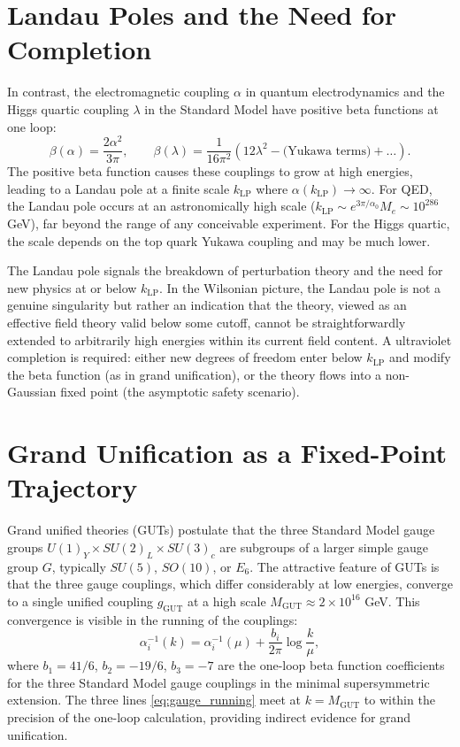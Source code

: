 \documentclass[11pt, twoside, openright]{book}
\theoremstyle{dotted}
\theoremstyle{definition}
\begin{document}
\section{Landau Poles and the Need for Completion}

In contrast, the electromagnetic coupling $\alpha$ in quantum electrodynamics and
the Higgs quartic coupling $\lambda$ in the Standard Model have positive beta
functions at one loop:
\begin{equation}
  \beta(\alpha) = \frac{2\alpha^2}{3\pi}, \qquad
  \beta(\lambda) = \frac{1}{16\pi^2}\left(12\lambda^2 - \text{(Yukawa terms)} + \ldots\right).
  \label{eq:qed_higgs_beta}
\end{equation}
The positive beta function causes these couplings to grow at high energies, leading
to a Landau pole at a finite scale $k_{\mathrm{LP}}$ where $\alpha(k_{\mathrm{LP}})
\to \infty$. For QED, the Landau pole occurs at an astronomically high scale
($k_{\mathrm{LP}} \sim e^{3\pi/\alpha_0} M_e \sim 10^{286}$ GeV), far beyond the
range of any conceivable experiment. For the Higgs quartic, the scale depends on
the top quark Yukawa coupling and may be much lower.

The Landau pole signals the breakdown of perturbation theory and the need for new
physics at or below $k_{\mathrm{LP}}$. In the Wilsonian picture, the Landau pole
is not a genuine singularity but rather an indication that the theory, viewed as
an effective field theory valid below some cutoff, cannot be straightforwardly
extended to arbitrarily high energies within its current field content. A
ultraviolet completion is required: either new degrees of freedom enter below
$k_{\mathrm{LP}}$ and modify the beta function (as in grand unification), or the
theory flows into a non-Gaussian fixed point (the asymptotic safety scenario).

\section{Grand Unification as a Fixed-Point Trajectory}

Grand unified theories (GUTs) postulate that the three Standard Model gauge groups
$U(1)_Y \times SU(2)_L \times SU(3)_c$ are subgroups of a larger simple gauge
group $G$, typically $SU(5)$, $SO(10)$, or $E_6$. The attractive feature of GUTs
is that the three gauge couplings, which differ considerably at low energies,
converge to a single unified coupling $g_{\mathrm{GUT}}$ at a high scale
$M_{\mathrm{GUT}} \approx 2 \times 10^{16}$ GeV. This convergence is visible
in the running of the couplings:
\begin{equation}
  \alpha_i^{-1}(k) = \alpha_i^{-1}(\mu) + \frac{b_i}{2\pi}\log\frac{k}{\mu},
  \label{eq:gauge_running}
\end{equation}
where $b_1 = 41/6$, $b_2 = -19/6$, $b_3 = -7$ are the one-loop beta function
coefficients for the three Standard Model gauge couplings in the minimal
supersymmetric extension. The three lines \eqref{eq:gauge_running} meet at
$k = M_{\mathrm{GUT}}$ to within the precision of the one-loop calculation,
providing indirect evidence for grand unification.
\end{document}
